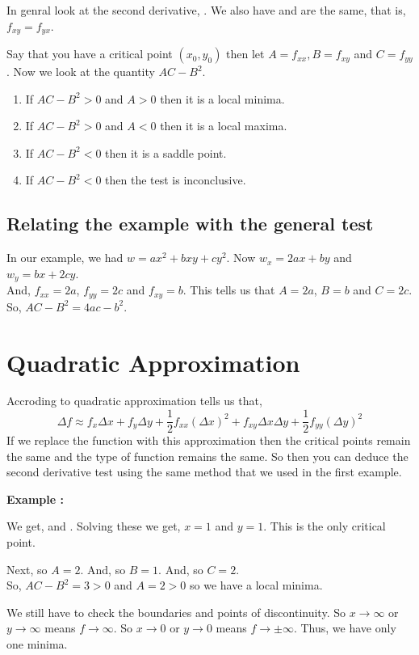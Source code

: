 In genral look at the second derivative, .
We also have  and  are the same, that is, $f_{xy} = f_{yx}$.

Say that you have a critical point $(x_0, y_0)$ then let $A = f_{xx}, B = f_{xy}$ and $C = f_{yy}$.
Now we look at the quantity $AC - B^2$.

\begin{enumerate}
    \item If $AC - B^2 > 0$ and $A > 0$ then it is a local minima.
    \item If $AC - B^2 > 0$ and $A < 0$ then it is a local maxima.
    \item If $AC - B^2 < 0$ then it is a saddle point.
    \item If $AC - B^2 < 0$ then the test is inconclusive.
\end{enumerate}

\subsection{Relating the example with the general test}

In our example, we had $w = ax^2 + bxy + cy^2$. Now $w_x = 2ax + by$ and $w_{y} = bx + 2cy$. \\
And, $f_{xx} = 2a$, $f_{yy} = 2c$ and $f_{xy} = b$. This tells us that $A = 2a$, $B = b$ and $C = 2c$. \\
So, $AC - B^2 = 4ac - b^2$.


\section{Quadratic Approximation}

Accroding to quadratic approximation tells us that, 
$$
\Delta f \approx f_x \Delta x + f_y \Delta y + \frac{1}{2} f_{xx} (\Delta x)^2 + f_{xy} \Delta x \Delta y + \frac{1}{2} f_{yy} (\Delta y)^2 
$$
If we replace the function with this approximation then the critical points remain the same and the type of function remains the same.
So then you can deduce the second derivative test using the same method that we used in the first example.

{\bf Example : } 

We get,  and  .
Solving these we get, $x = 1$ and $y = 1$. This is the only critical point.

Next,  so $A = 2$. 
And,  so $B = 1$.
And,  so $C = 2$. \\
So, $AC - B^2 = 3 > 0$ and $A = 2 > 0$ so we have a local minima.

We still have to check the boundaries and points of discontinuity. 
So $x \to \infty$ or $y \to \infty$ means $f \to \infty$.
So $x \to 0$ or $y \to 0$ means $f \to \pm \infty$. Thus, we have only one minima.
